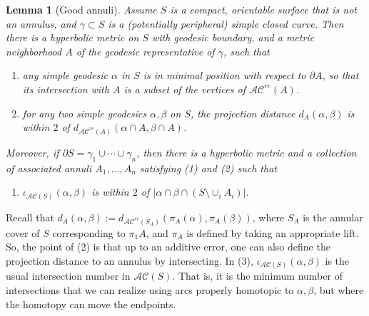 \documentclass[11pt]{amsart}
\newtheorem{lemma}[theorem]{Lemma}
\theoremstyle{remark}
\numberwithin{equation}{section}
\newcommand{\cAC}{\mathcal{AC}}
\newcommand{\acre}{\cAC^{re}}
\begin{document}
\begin{lemma}[Good annuli] \label{intersecting with the annulus}  Assume $S $ is a compact, orientable surface  that is not an annulus, and $\gamma \subset S$  is a (potentially peripheral) simple closed curve. Then there is a hyperbolic metric on $S$ with geodesic boundary, and a metric neighborhood $A$ of the geodesic representative of $\gamma$, such that 
\begin {enumerate}
\item  any simple geodesic $\alpha$ in $S$ is in minimal position with respect to $\partial A$, so that its intersection with $A$  is  a subset of the vertices of $\acre(A)$.
\item[(2)] for any two simple geodesics $\alpha,\beta$ on $S$, the projection distance $d_{A}(\alpha,\beta)$ is within $2 $ of $d_{\acre(A)}(\alpha \cap A,\beta \cap A)$.
\end{enumerate}
 Moreover,  if $\partial S = \gamma_1 \cup \cdots \cup \gamma_n$, then there is a hyperbolic metric and a collection of associated annuli $A_1,\ldots, A_n$ satisfying (1) and (2) such that 
 \begin{enumerate}
\item[(3)] $\iota_{\mathcal {AC}(S)}(\alpha,\beta)$ is within $2 $ of $|\alpha  \cap \beta \cap (S \setminus \cup_i A_i)|$.
\end {enumerate}
\end{lemma}


 Recall that $d_A(\alpha,\beta) :=d_{\acre(S_A)}(\pi_A(\alpha),\pi_A(\beta))$, where $S_A$ is the annular cover of $S$ corresponding to $\pi_1 A$, and $\pi_A $ is defined by taking an appropriate lift. So, the point of (2) is that up to an additive error, one can also define the projection distance to an annulus by intersecting. In (3), $\iota_{\mathcal {AC}(S)}(\alpha,\beta)$  is  the usual intersection number in $\mathcal {AC}(S)$.  That is, it is the minimum number of intersections that we can realize using arcs properly homotopic to $\alpha,\beta$, but where the homotopy can move the endpoints.
\end{document}
